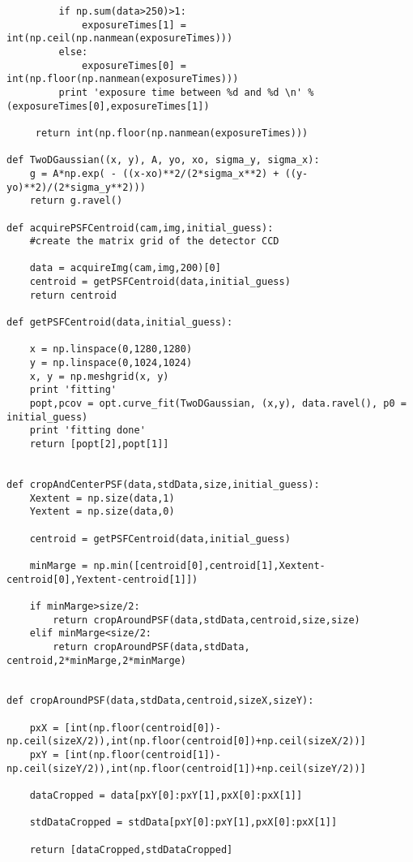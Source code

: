 \begin{lstlisting}
         if np.sum(data>250)>1:
             exposureTimes[1] = int(np.ceil(np.nanmean(exposureTimes)))
         else:
             exposureTimes[0] = int(np.floor(np.nanmean(exposureTimes)))
         print 'exposure time between %d and %d \n' %(exposureTimes[0],exposureTimes[1])

     return int(np.floor(np.nanmean(exposureTimes)))

def TwoDGaussian((x, y), A, yo, xo, sigma_y, sigma_x):
    g = A*np.exp( - ((x-xo)**2/(2*sigma_x**2) + ((y-yo)**2)/(2*sigma_y**2)))
    return g.ravel()

def acquirePSFCentroid(cam,img,initial_guess):
    #create the matrix grid of the detector CCD

    data = acquireImg(cam,img,200)[0]
    centroid = getPSFCentroid(data,initial_guess)
    return centroid

def getPSFCentroid(data,initial_guess):
    
    x = np.linspace(0,1280,1280)
    y = np.linspace(0,1024,1024)
    x, y = np.meshgrid(x, y)
    print 'fitting'
    popt,pcov = opt.curve_fit(TwoDGaussian, (x,y), data.ravel(), p0 = initial_guess)
    print 'fitting done'
    return [popt[2],popt[1]]


def cropAndCenterPSF(data,stdData,size,initial_guess):
    Xextent = np.size(data,1)
    Yextent = np.size(data,0)

    centroid = getPSFCentroid(data,initial_guess)

    minMarge = np.min([centroid[0],centroid[1],Xextent-centroid[0],Yextent-centroid[1]])

    if minMarge>size/2:
        return cropAroundPSF(data,stdData,centroid,size,size)
    elif minMarge<size/2:
        return cropAroundPSF(data,stdData, centroid,2*minMarge,2*minMarge)


def cropAroundPSF(data,stdData,centroid,sizeX,sizeY):

    pxX = [int(np.floor(centroid[0])-np.ceil(sizeX/2)),int(np.floor(centroid[0])+np.ceil(sizeX/2))]
    pxY = [int(np.floor(centroid[1])-np.ceil(sizeY/2)),int(np.floor(centroid[1])+np.ceil(sizeY/2))]

    dataCropped = data[pxY[0]:pxY[1],pxX[0]:pxX[1]]

    stdDataCropped = stdData[pxY[0]:pxY[1],pxX[0]:pxX[1]]

    return [dataCropped,stdDataCropped]

\end{lstlisting}

